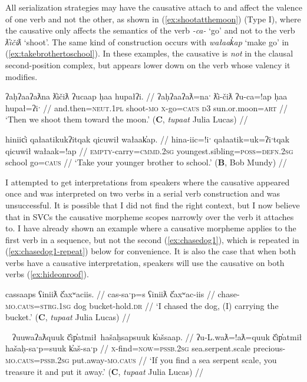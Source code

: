 All serialization strategies may have the causative attach to and affect the valence of one verb and not the other, as shown in (\ref{ex:shootatthemoon}) (Type I), where the causative only affects the semantics of the verb \textit{-ca-} `go' and not to the verb \textit{ƛ̓ičiƛ} `shoot'. The same kind of construction occurs with \textit{wałaak̓ap} `make go' in (\ref{ex:takebrothertoschool}). In these examples, the causative is \textit{not} in the clausal second-position complex, but appears lower down on the verb whose valency it modifies.

\ex \label{ex:shootatthemoon}
\begingl
\glpreamble ʔaḥʔaaʔaƛna ƛ̓ičiƛ ʔucaap ḥaa hupałʔi. //
\gla ʔaḥʔaaʔaƛ=naˑ ƛ̓i-čiƛ ʔu-ca=!ap ḥaa hupał=ʔiˑ //
\glb and.then=\textsc{neut.1pl} shoot-\textsc{mo} \textsc{x}-go=\textsc{caus} \textsc{d3} sun.or.moon=\textsc{art} //
\glft `Then we shoot them toward the moon.' (\textbf{C}, \textit{tupaat} Julia Lucas) //
\endgl
\xe

\ex \label{ex:takebrothertoschool}
\begingl
\glpreamble hiniic̓i qałaatikukʔitqak qicuwił wałaak̓ap. //
\gla hina-iic=!iˑ qałaatik=uk=ʔiˑtqak qicuwił wałaak=!ap //
\glb \textsc{empty}-carry=\textsc{cmmd.2sg} youngest.sibling=\textsc{poss}=\textsc{defn.2sg} school go=\textsc{caus} //
\glft `Take your younger brother to school.' (\textbf{B}, Bob Mundy) //
\endgl
\xe

I attempted to get interpretations from speakers where the causative appeared once and was interpreted on two verbs in a serial verb construction and was unsuccessful. It is possible that I did not find the right context, but I now believe that in SVCs the causative morpheme scopes narrowly over the verb it attaches to. I have already shown an example where a causative morpheme applies to the first verb in a sequence, but not the second (\ref{ex:chasedog1}), which is repeated in (\ref{ex:chasedog1-repeat}) below for convenience. It is also the case that when both verbs have a causative interpretation, speakers will use the causative on both verbs (\ref{ex:hideonroof}).

\ex \label{ex:chasedog1-repeat}
\begingl
\glpreamble cassaaps ʕiniiƛ č̓axʷaciis. //
\gla cas-saˑp=s ʕiniiƛ č̓axʷac-iis //
\glb chase-\textsc{mo.caus}=\textsc{strg.1sg} dog bucket-hold.\textsc{dr} //
\glft `I chased the dog, (I) carrying the bucket.' (\textbf{C}, \textit{tupaat} Julia Lucas) //
\endgl
\xe

\ex~ \label{ex:makepreciousputaway}
\begingl
\glpreamble ʔuuwaʔaƛquuk č̓ip̓atmił\footnotemark\ hašaḥsapsuuk k̓ašsaap. //
\gla ʔu-L.waƛ=!aƛ=quuk č̓ip̓atmił hašaḥ-saˑp=suuk k̓aš-saˑp //
\glb \textsc{x}-find=\textsc{now}=\textsc{pssb.2sg} sea.serpent.scale precious-\textsc{mo.caus}=\textsc{pssb.2sg} put.away-\textsc{mo.caus} //
\glft `If you find a sea serpent scale, you treasure it and put it away.' (\textbf{C}, \textit{tupaat} Julia Lucas) //
\endgl
\xe

